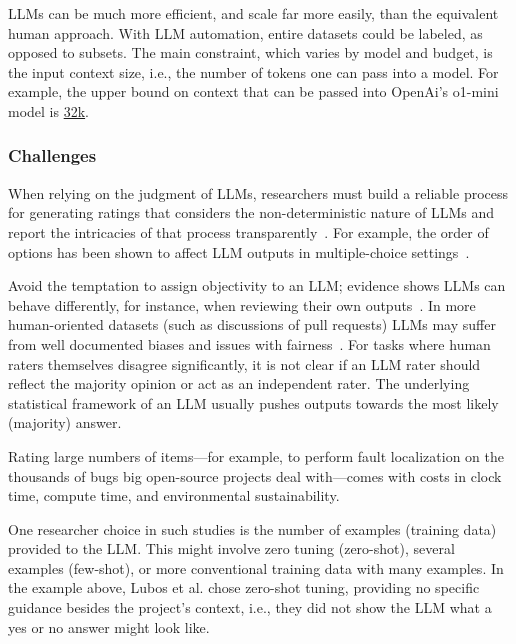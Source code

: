LLMs can be much more efficient, and scale far more easily, than the equivalent human approach. With LLM automation, entire datasets could be labeled, as opposed to subsets. The main constraint, which varies by model and budget, is the input context size, i.e., the number of tokens one can pass into a model. For example, the upper bound on context that can be passed into OpenAi's \textsf{o1-mini} model is \href{https://help.openai.com/en/articles/9855712-openai-o1-models-faq-chatgpt-enterprise-and-edu}{32k}. 

\subsubsection{Challenges}

When relying on the judgment of LLMs, researchers must build a reliable process for generating ratings that considers the non-deterministic nature of LLMs and report the intricacies of that process transparently~\cite{DBLP:journals/corr/abs-2412-12509}. For example, the order of options has been shown to affect LLM outputs in multiple-choice settings~\cite{DBLP:conf/naacl/PezeshkpourH24}.

Avoid the temptation to assign objectivity to an LLM; evidence shows LLMs can behave differently, for instance, when reviewing their own outputs~\cite{NEURIPS2024_7f1f0218}. In more human-oriented datasets (such as discussions of pull requests) LLMs may suffer from well documented biases and issues with fairness~\cite{Gallegos2024BiasAF}. 
For tasks where human raters themselves disagree significantly, it is not clear if an LLM rater should reflect the majority opinion or act as an independent rater. The underlying statistical framework of an LLM usually pushes outputs towards the most likely (majority) answer. 

Rating large numbers of items---for example, to perform fault localization on the thousands of bugs big open-source projects deal with---comes with costs in clock time, compute time, and environmental sustainability.

One researcher choice in such studies is the number of examples (training data) provided to the LLM. This might involve zero tuning (zero-shot), several examples (few-shot), or more conventional training data with many examples. In the example above, Lubos et al. chose zero-shot tuning, providing no specific guidance besides the project's context, i.e., they did not show the LLM what a yes or no answer might look like. 

